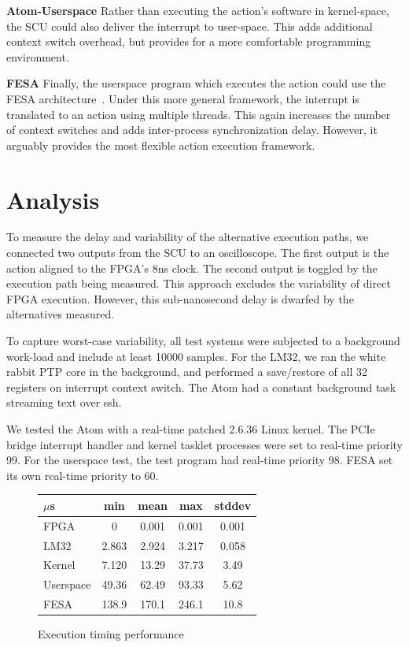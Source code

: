 \documentclass{JAC2003}
\begin{document}
\textbf{Atom-Userspace}
Rather than executing the action's software in kernel-space,
the SCU could also deliver the interrupt to user-space.
This adds additional context switch overhead, 
but provides for a more comfortable programming environment.

\textbf{FESA}
Finally, the userspace program which executes the action could use the FESA
architecture~\cite{fesa}.
Under this more general framework,
the interrupt is translated to an action using multiple threads.
This again increases the number of context switches and adds inter-process
synchronization delay.
However, it arguably provides the most flexible action execution framework.

\section{Analysis}
To measure the delay and variability of the alternative execution paths,
we connected two outputs from the SCU to an oscilloscope.
The first output is the action aligned to the FPGA's 8ns clock.
The second output is toggled by the execution path being measured.
This approach excludes the variability of direct FPGA execution.
However, this sub-nanosecond delay is dwarfed by the alternatives measured.

To capture worst-case variability, 
all test systems were subjected to a background work-load
and include at least 10000 samples.
For the LM32, 
we ran the white rabbit PTP core in the background,
and performed a save/restore of all 32 registers on interrupt context switch.
The Atom had a constant background task streaming text over ssh.

We tested the Atom with a real-time patched 2.6.36 Linux kernel.
The PCIe bridge interrupt handler and kernel tasklet processes were set to
real-time priority 99.
For the userspace test, the test program had real-time priority 98.
FESA set its own real-time priority to 60.

\begin{figure}[t]
   \centering
   \begin{tabular}{l|c|c|c|c}
     $\mu$s    & min   & mean  & max   & stddev \\
     \hline
     FPGA      & 0 & 0.001 & 0.001 & 0.001 \\
     LM32      & 2.863 & 2.924 & 3.217 & 0.058  \\
     Kernel    & 7.120 & 13.29 & 37.73 & 3.49   \\
     Userspace & 49.36 & 62.49 & 93.33 & 5.62   \\
     FESA      & 138.9 & 170.1 & 246.1 & 10.8 \\
   \end{tabular}
   \caption{Execution timing performance}
\end{figure}
\end{document}
